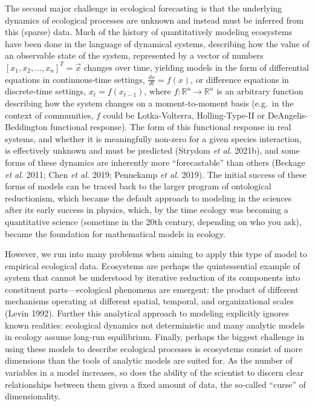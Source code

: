 \documentclass[11pt]{article}
\begin{document}
The second major challenge in ecological forecasting is that the
underlying dynamics of ecological processes are unknown and instead must
be inferred from this (sparse) data. Much of the history of
quantitatively modeling ecosystems have been done in the language of
dynamical systems, describing how the value of an observable state of
the system, represented by a vector of numbers
\([x_1, x_2, \dots, x_n]^T = \vec{x}\) changes over time, yielding
models in the form of differential equations in continuous-time
settings, \(\frac{dx}{dt} = f(x)\), or difference equations in
discrete-time settings, \(x_t = f(x_{t-1})\), where
\(f:\mathbb{R}^n \to \mathbb{R}^n\) is an arbitrary function describing
how the system changes on a moment-to-moment basis (e.g.~in the context
of communities, \(f\) could be Lotka-Volterra, Holling-Type-II or
DeAngelis-Beddington functional response). The form of this functional
response in real systems, and whether it is meaningfully non-zero for a
given species interaction, is effectively unknown and must be predicted
(Strydom \emph{et al.} 2021b), and some forms of these dynamics are
inherently more ``forecastable'' than others (Beckage \emph{et al.}
2011; Chen \emph{et al.} 2019; Pennekamp \emph{et al.} 2019). The
initial success of these forms of models can be traced back to the
larger program of ontological reductionism, which became the default
approach to modeling in the sciences after its early success in physics,
which, by the time ecology was becoming a quantitative science (sometime
in the 20th century, depending on who you ask), became the foundation
for mathematical models in ecology.

However, we run into many problems when aiming to apply this type of
model to empirical ecological data. Ecosystems are perhaps the
quintessential example of system that cannot be understood by iterative
reduction of its components into constituent parts---ecological
phenomena are emergent: the product of different mechanisms operating at
different spatial, temporal, and organizational scales (Levin 1992).
Further this analytical approach to modeling explicitly ignores known
realities: ecological dynamics not deterministic and many analytic
models in ecology assume long-run equilibrium. Finally, perhaps the
biggest challenge in using these models to describe ecological processes
is ecosystems consist of more dimensions than the tools of analytic
models are suited for. As the number of variables in a model increases,
so does the ability of the scientist to discern clear relationships
between them given a fixed amount of data, the so-called ``curse'' of
dimensionality.
\end{document}
